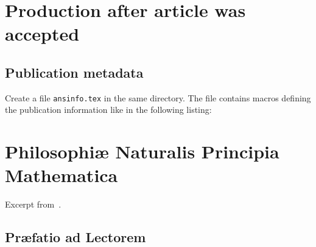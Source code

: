 \documentclass{ansarticle}
\begin{document}
\section{Production after article was accepted}
\subsection{Publication metadata}

Create a file \texttt{ansinfo.tex} in the same directory. The file
contains macros defining the publication information like in the
following listing:



\section{Philosophi\ae{} Naturalis Principia Mathematica}

Excerpt from~\cite{Newton87}.

\subsection{Pr\ae{}fatio ad Lectorem}
\end{document}
